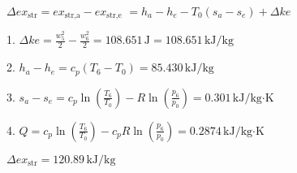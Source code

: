 \( \Delta ex_{\text{str}} = ex_{\text{str,a}} - ex_{\text{str,e}} \)  
\( = h_a - h_e - T_0 \left( s_a - s_e \right) + \Delta ke \)  

1. \( \Delta ke = \frac{w_5^2}{2} - \frac{w_6^2}{2} = 108.651 \, \text{J} = 108.651 \, \text{kJ/kg} \)  

2. \( h_a - h_e = c_p \left( T_6 - T_0 \right) = 85.430 \, \text{kJ/kg} \)  

3. \( s_a - s_e = c_p \ln \left( \frac{T_6}{T_0} \right) - R \ln \left( \frac{p_6}{p_0} \right) = 0.301 \, \text{kJ/kg·K} \)  

4. \( Q = c_p \ln \left( \frac{T_6}{T_0} \right) - c_p R \ln \left( \frac{p_6}{p_0} \right) = 0.2874 \, \text{kJ/kg·K} \)  

\( \Delta ex_{\text{str}} = 120.89 \, \text{kJ/kg} \)